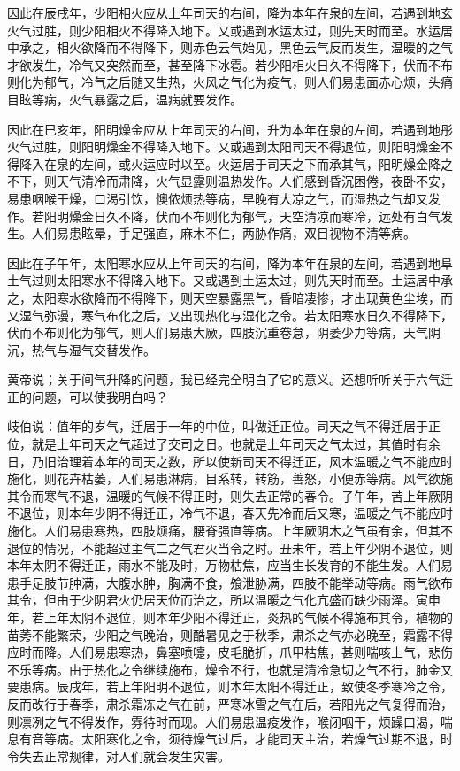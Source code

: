 \documentclass[12pt,UTF8]{ctexbook}
\begin{document}
因此在辰戌年，少阳相火应从上年司天的右间，降为本年在泉的左间，若遇到地玄火气过胜，则少阳相火不得降入地下。又或遇到水运太过，则先天时而至。水运居中承之，相火欲降而不得降下，则赤色云气始见，黑色云气反而发生，温暖的之气才欲发生，冷气又突然而至，甚至降下冰雹。若少阳相火日久不得降下，伏而不布则化为郁气，冷气之后随又生热，火风之气化为疫气，则人们易患面赤心烦，头痛目眩等病，火气暴露之后，温病就要发作。

因此在巳亥年，阳明燥金应从上年司天的右间，升为本年在泉的左间，若遇到地彤火气过胜，则阳明燥金不得降入地下。又或遇到太阳司天不得退位，则阳明燥金不得降入在泉的左间，或火运应时以至。火运居于司天之下而承其气，阳明燥金降之不下，则天气清冷而肃降，火气显露则温热发作。人们感到昏沉困倦，夜卧不安，易患咽喉干燥，口渴引饮，懊侬烦热等病，早晚有大凉之气，而湿热之气却又发作。若阳明燥金日久不降，伏而不布则化为郁气，天空清凉而寒冷，远处有白气发生。人们易患眩晕，手足强直，麻木不仁，两胁作痛，双目视物不清等病。

因此在子午年，太阳寒水应从上年司天的右间，降为本年在泉的左间，若遇到地阜土气过则太阳寒水不得降入地下。又或遇到土运太过，则先天时而至。土运居中承之，太阳寒水欲降而不得降下，则天空暴露黑气，昏暗凄惨，才出现黄色尘埃，而又湿气弥漫，寒气布化之后，又出现热化与湿化之令。若太阳寒水日久不得降下，伏而不布则化为郁气，则人们易患大厥，四肢沉重卷怠，阴萎少力等病，天气阴沉，热气与湿气交替发作。

黄帝说；关于间气升降的问题，我已经完全明白了它的意义。还想听听关于六气迁正的问题，可以使我明白吗？

岐伯说：值年的岁气，迁居于一年的中位，叫做迁正位。司天之气不得迁居于正位，就是上年司天之气超过了交司之日。也就是上年司天之气太过，其值时有余日，乃旧治理着本年的司天之数，所以使新司天不得迁正，风木温暖之气不能应时施化，则花卉枯萎，人们易患淋病，目系转，转筋，善怒，小便赤等病。风气欲施其令而寒气不退，温暖的气候不得正时，则失去正常的春令。子午年，苦上年厥阴不退位，则本年少阴不得迁正，冷气不退，春天先冷而后又寒，温暖之气不能应时施化。人们易患寒热，四肢烦痛，腰脊强直等病。上年厥阴木之气虽有余，但其不退位的情况，不能超过主气二之气君火当令之时。丑未年，若上年少阴不退位，则本年太阴不得迁正，雨水不能及时，万物枯焦，应当生长发育的不能生发。人们易患手足肢节肿满，大腹水肿，胸满不食，飧泄胁满，四肢不能举动等病。雨气欲布其令，但由于少阴君火仍居天位而治之，所以温暖之气化亢盛而缺少雨泽。寅申年，若上年太阴不退位，则本年少阳不得迁正，炎热的气候不得施布其令，植物的苗莠不能繁荣，少阳之气晚治，则酷暑见之于秋季，肃杀之气亦必晚至，霜露不得应时而降。人们易患寒热，鼻塞喷嚏，皮毛脆折，爪甲枯焦，甚则喘咳上气，悲伤不乐等病。由于热化之令继续施布，燥令不行，也就是清冷急切之气不行，肺金又要患病。辰戌年，若上年阳明不退位，则本年太阳不得迁正，致使冬季寒冷之令，反而改行于春季，肃杀霜冻之气在前，严寒冰雪之气在后，若阳光之气复得而治，则凛冽之气不得发作，雰待时而现。人们易患温疫发作，喉闭咽干，烦躁口渴，喘息有音等病。太阳寒化之令，须待燥气过后，才能司天主治，若燥气过期不退，时令失去正常规律，对人们就会发生灾害。
\end{document}
